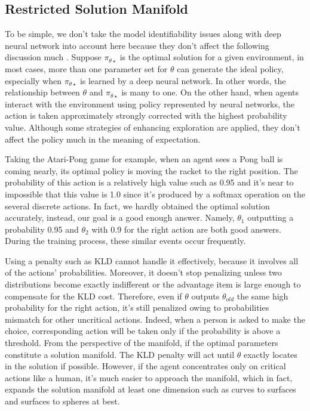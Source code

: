 \documentclass{article}
\begin{document}
\subsection{Restricted Solution Manifold}
To be simple, we don't take the model identifiability issues along with deep neural network into account here because they don't affect the following discussion much \cite{goodfellow2016deep}. Suppose $\pi_{\theta\star}$ is the optimal solution for a given environment, in most cases, more than one parameter set for $\theta$ can generate the ideal policy, especially when $\pi_{\theta\star}$ is learned by a deep neural network. In other words, the relationship between $\theta$ and $\pi_{\theta\star}$ is many to one. On the other hand, when agents interact with the environment using policy represented by neural networks, the action is taken approximately strongly corrected with the highest probability value. Although some strategies of enhancing exploration are applied, they don't affect the policy much in the meaning of expectation. 

Taking the Atari-Pong game for example, when an agent sees a Pong ball is coming nearly, its optimal policy is moving the racket to  the right position. The probability of this action is a relatively high value such as 0.95 and it's near to impossible that this value is 1.0 since it's produced by a softmax operation on the several discrete actions. In fact, we hardly obtained the optimal solution accurately, instead, our goal is a good enough answer. Namely, $\theta_1$ outputting a probability 0.95 and $\theta_2$ with 0.9 for the right action are both good answers. During the training process, these similar events occur frequently.

Using a penalty such as KLD cannot handle it effectively, because it involves all of the actions' probabilities. Moreover, it doesn't stop penalizing unless two distributions become exactly indifferent or the advantage item is large enough to compensate for the KLD cost. Therefore, even if $\theta$ outputs $\theta_{old}$ the same high probability for the right action, it's still penalized owing to probabilities mismatch for other uncritical actions. Indeed, when a person is asked to make the choice, corresponding action will be taken only if the probability is above a threshold. From the perspective of the manifold, if the optimal parameters constitute a solution manifold. The KLD penalty will act until $\theta$ exactly locates in the solution if possible. However, if the agent concentrates only on critical actions like a human, it's much easier to approach the manifold, which in fact, expands the solution manifold at least one dimension such as curves to surfaces and surfaces to spheres at best.
\end{document}
